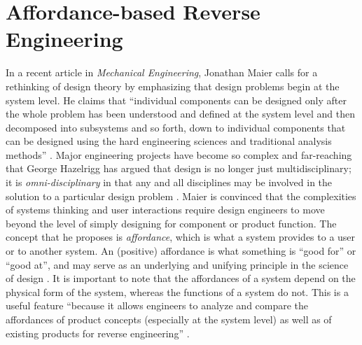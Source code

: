 \section{Affordance-based Reverse Engineering}

In a recent article in \textit{Mechanical Engineering}, Jonathan Maier
calls for a rethinking of design theory by emphasizing that design
problems begin at the system level. He claims that ``individual
components can be designed only after the whole problem has been
understood and defined at the system level and then decomposed into
subsystems and so forth, down to individual components that can be
designed using the hard engineering sciences and traditional analysis
methods'' \citep[p.~34]{maier2008}\citep{maier2011}. Major engineering projects have become so
complex and far-reaching that George Hazelrigg has argued that design
is no longer just multidisciplinary; it is \textit{omni-disciplinary}
in that any and all disciplines may be involved in the solution to a
particular design problem \citep{hazelrigg1996}. Maier is convinced that
the complexities of systems thinking and user interactions require
design engineers to move beyond the level of simply designing for
component or product function. The concept that he proposes is
\textit{affordance}, which is what a system provides to a user or to
another system. An (positive) affordance is what something is “good
for” or “good at”, and may serve as an underlying and unifying
principle in the science of design \citep{maierfadel2001}. It is important
to note that the affordances of a system depend on the physical form of
the system, whereas the functions of a system do not. This is a useful
feature “because it allows engineers to analyze and compare the
affordances of product concepts (especially at the system level) as
well as of existing products for reverse
engineering” \citep[][p.~36]{maier2008}.

